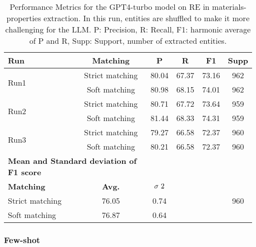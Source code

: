 \begin{table}[htbp]
    \small
    \centering
    \caption{Performance Metrics for the GPT4-turbo model on RE in materials-properties extraction. In this run, entities are shuffled to make it more challenging for the LLM. P: Precision, R: Recall, F1: harmonic average of P and R, Supp: Support, number of extracted entities.}
    \begin{tabular}{lccccc}
        \toprule
        \textbf{Run} & \textbf{Matching} & \textbf{P} & \textbf{R} & \textbf{F1} & \textbf{Supp} \\
        \midrule
        \multirow{2}{*}{Run1} & Strict matching & 80.04 & 67.37 & 73.16 & 962 \\
        & Soft matching & 80.98 & 68.15 & 74.01 & 962 \\
        \midrule
        \multirow{2}{*}{Run2} & Strict matching & 80.71 & 67.72 & 73.64 & 959 \\
        & Soft matching & 81.44 & 68.33 & 74.31 & 959 \\
        \midrule
        \multirow{2}{*}{Run3} & Strict matching & 79.27 & 66.58 & 72.37 & 960 \\
        & Soft matching & 80.21 & 66.58 & 72.37 & 960 \\
        \midrule
        \multicolumn{2}{l}{\textbf{Mean and Standard deviation of F1 score}} & & & & \\
        \midrule
        \textbf{Matching} & \textbf{Avg.} & $\sigma\textsuperscript{2}$ & & & \\
        Strict matching & 76.05 & 0.74 & & & 960 \\
        Soft matching & 76.87 & 0.64 & & & \\
        \bottomrule
    \end{tabular}
\end{table}


\clearpage
\subsubsection{Few-shot}



